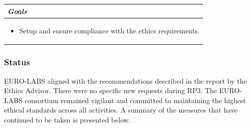 \begin{table}[H]
{\begin{tabular}{|p{}|}
        \hline
        \rowcolor{mylightergray} \textit{Goals} \\
        \hline
        \rowcolor{white} 
        \hspace*{-0.75cm} 
        \begin{minipage}[t]{\textwidth}
    		\begin{itemize}
    		    \item Setup and ensure compliance with the ethics requirements.
    		\end{itemize} 
    		\vspace*{0.10em}
		\end{minipage}        
        \\
        \hline
    \end{tabular}}
    \vspace{0.5em}\vfill
\end{table}


\subsubsection*{Status}

EURO-LABS aligned with the recommendations described in the report by the  Ethics Advisor.
 There were no specific new requests during RP3. 
The EURO-LABS consortium remained vigilant and committed to maintaining the highest ethical standards across all activities. %
 A summary of the measures that have continued to be taken is presented below. 

